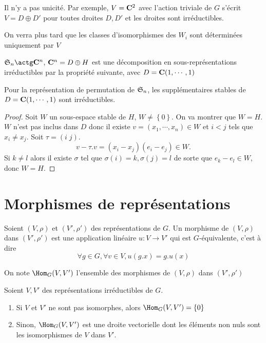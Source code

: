 \begin{rem}
Il n'y a pas unicité. Par exemple, $V=\mathbf C^2$ avec l'action triviale de $G$ s'écrit  $V=D\oplus D'$ pour toutes droites  $D,D'$ et les droites sont irréductibles. 

On verra plus tard que les classes d'isomorphismes des $W_i$ sont déterminées uniquement par  $V$
\end{rem}

\begin{ex}
    $\gS_n\actg \C^n$, $\mathbf C^n=D\oplus H$ est une décomposition en sous-représentations irréductibles par la propriété suivante, avec $D=\mathbf C (1,\cdots ,1)$
\end{ex}

\begin{prop}
    Pour la représentation de permutation de $\mathfrak S_n$, les supplémentaires stables de  $D=\mathbf C(1,\cdots ,1)$ sont irréductibles.
\end{prop}

\begin{proof}
    Soit $W$ un sous-espace stable de  $H$,  $W\neq \left\{ 0 \right\} $. On va montrer que $W =H$.  $W$ n'est pas inclus dans  $D$ donc il existe  $v=(x_1,\cdots ,x_n) \in  W$ et $i<j$ tels que  $x_i\neq x_j$. Soit $\tau = (i\;j)$. \[v-\tau.v=(x_i-x_j)(e_i-e_j) \in  W.\] Si $k\neq l$ alors il existe  $\sigma$ tel que  $\sigma(i)=k, \sigma(j)=l$ de sorte que  $e_k-e_l \in  W$, donc $W=H$.
\end{proof}

\section{Morphismes de représentations}

\begin{dfn}
    Soient $(V, \rho)$ et  $(V', \rho')$ des représentations de  $G$. Un morphisme de  $(V, \rho)$ dans  $(V', \rho')$ est une application linéaire  $u:V\longrightarrow V'$ qui est $G$-équivalente, c'est à dire  \[
        \forall  g \in  G, \forall  v \in  V, u(g.x)=g.u(x)
    \] 
\end{dfn}

\begin{rem}[Notation]
    On note $\Hom_G(V, V')$ l'ensemble des morphismes de $(V, \rho)$ dans $(V', \rho')$
\end{rem}

\begin{lmm}
Soient $V, V'$ des représentations irréductibles de  $G$.
 \begin{enumerate}
     \item Si $V$ et  $V'$ ne sont pas isomorphes, alors  $\Hom_G(V, V')= \left\{ 0 \right\} $ 
     \item Sinon, $\Hom_G(V, V')$ est une droite vectorielle dont les éléments non nuls sont les isomorphismes de  $V$ dans  $V'$.
\end{enumerate}
\end{lmm}


